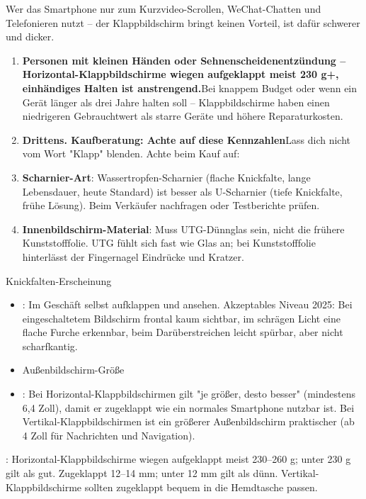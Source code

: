 Wer das Smartphone nur zum Kurzvideo-Scrollen, WeChat-Chatten und Telefonieren nutzt – der Klappbildschirm bringt keinen Vorteil, ist dafür schwerer und dicker.

\begin{enumerate}
  \item \textbf{Personen mit kleinen Händen oder Sehnenscheidenentzündung – Horizontal-Klappbildschirme wiegen aufgeklappt meist 230 g+, einhändiges Halten ist anstrengend.}Bei knappem Budget oder wenn ein Gerät länger als drei Jahre halten soll – Klappbildschirme haben einen niedrigeren Gebrauchtwert als starre Geräte und höhere Reparaturkosten.
  \item \textbf{Drittens. Kaufberatung: Achte auf diese Kennzahlen}Lass dich nicht vom Wort "Klapp" blenden. Achte beim Kauf auf:
  \item \textbf{Scharnier-Art}: Wassertropfen-Scharnier (flache Knickfalte, lange Lebensdauer, heute Standard) ist besser als U-Scharnier (tiefe Knickfalte, frühe Lösung). Beim Verkäufer nachfragen oder Testberichte prüfen.
  \item \textbf{Innenbildschirm-Material}: Muss UTG-Dünnglas sein, nicht die frühere Kunststofffolie. UTG fühlt sich fast wie Glas an; bei Kunststofffolie hinterlässt der Fingernagel Eindrücke und Kratzer.
\end{enumerate}

\begin{tcbwarn}{Knickfalten-Erscheinung}
\begin{itemize}
  \item : Im Geschäft selbst aufklappen und ansehen. Akzeptables Niveau 2025: Bei eingeschaltetem Bildschirm frontal kaum sichtbar, im schrägen Licht eine flache Furche erkennbar, beim Darüberstreichen leicht spürbar, aber nicht scharfkantig.
  \item Außenbildschirm-Größe
  \item : Bei Horizontal-Klappbildschirmen gilt "je größer, desto besser" (mindestens 6,4 Zoll), damit er zugeklappt wie ein normales Smartphone nutzbar ist. Bei Vertikal-Klappbildschirmen ist ein größerer Außenbildschirm praktischer (ab 4 Zoll für Nachrichten und Navigation).
\end{itemize}

\end{tcbwarn}


: Horizontal-Klappbildschirme wiegen aufgeklappt meist 230–260 g; unter 230 g gilt als gut. Zugeklappt 12–14 mm; unter 12 mm gilt als dünn. Vertikal-Klappbildschirme sollten zugeklappt bequem in die Hemdtasche passen.

